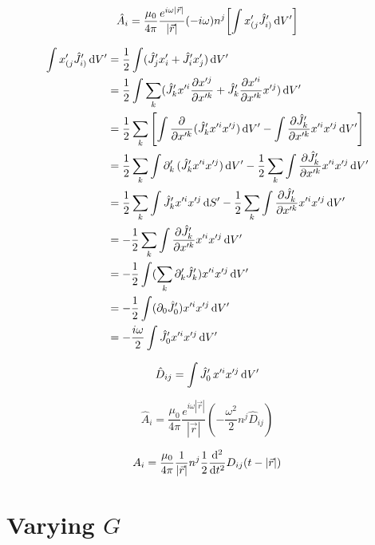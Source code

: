 \begin{equation}
    \hat{A}_i=\frac{\mu_0}{4\pi}\frac{e^{i\omega\left\lvert\vec{r}\right\rvert}}{\left\lvert\vec{r}\right\rvert}(-i\omega)n^j\!\left[\int {x}_{(j}'\hat{J}_{i)}'\,\mathrm{d} V'\right]
\end{equation}

\begin{align}
    \int {x}_{(j}'\hat{J}_{i)}'\,\mathrm{d} V'
    &= \frac{1}{2}\int (\hat{J}_{j}'{x}_{i}'+\hat{J}_{i}'{x}_{j}')\,\mathrm{d} V'\\
    &= \frac{1}{2}\int \sum_{k}(\hat{J}_{k}'x'^{i}\frac{\partial x'^{j}}{\partial x'^{k}}+\hat{J}_{k}'\frac{\partial x'^{i}}{\partial x'^{k}}x'^{j})\,\mathrm{d} V'\\
    &= \frac{1}{2}\sum_{k}\left[\int \frac{\partial }{\partial x'^k}(\hat{J}_{k}'x'^ix'^j)\,\mathrm{d} V'-\int \frac{\partial \hat{J}_{k}'}{\partial x'^k}x'^ix'^j\,\mathrm{d} V'\right]\\
    &= \frac{1}{2}\sum_{k}\int \partial'_k\,(\hat{J}_{k}'x'^ix'^j)\,\mathrm{d} V' -\frac{1}{2}\sum_{k}\int \frac{\partial \hat{J}_{k}'}{\partial x'^k}x'^ix'^j\,\mathrm{d} V'\\
    &= \frac{1}{2}\sum_{k}\int \hat{J}_{k}'x'^ix'^j\,\mathrm{d} S' -\frac{1}{2}\sum_{k}\int \frac{\partial \hat{J}_{k}'}{\partial x'^k}x'^ix'^j\,\mathrm{d} V'\\
    &= -\frac{1}{2}\sum_{k}\int \frac{\partial \hat{J}_{k}'}{\partial x'^k}x'^ix'^j\,\mathrm{d} V'\\
    &= -\frac{1}{2}\int (\sum_{k}\partial'_k\hat{J}_{k}')x'^ix'^j\,\mathrm{d} V'\\
    &= -\frac{1}{2}\int (\partial_0\hat{J}_{0}')x'^ix'^j\,\mathrm{d} V'\\
    &= -\frac{i\omega}{2}\int \hat{J}_{0}'x'^ix'^j\,\mathrm{d} V'
\end{align}

\begin{equation}
    \hat{D}_{ij}=\int \hat{J}_{0}'\,x'^ix'^j\,\mathrm{d} V'
\end{equation}

\begin{equation}
    \hat{A}_i=\frac{\mu_0}{4\pi}\frac{e^{i\omega\left\lvert\vec{r}\right\rvert}}{\left\lvert\vec{r}\right\rvert}(-\frac{\omega^2}{2}n^j\hat{D}_{ij}
    )
\end{equation}

\begin{equation}
    {A}_i=\frac{\mu_0}{4\pi}\frac{1}{\left\lvert\vec{r}\right\rvert}n^j\frac{1}{2}\frac{\mathrm{d}^2}{\mathrm{d} t^2}D_{ij}(t-\left\lvert\vec{r}\right\rvert)
\end{equation}

\section{Varying $G$}

